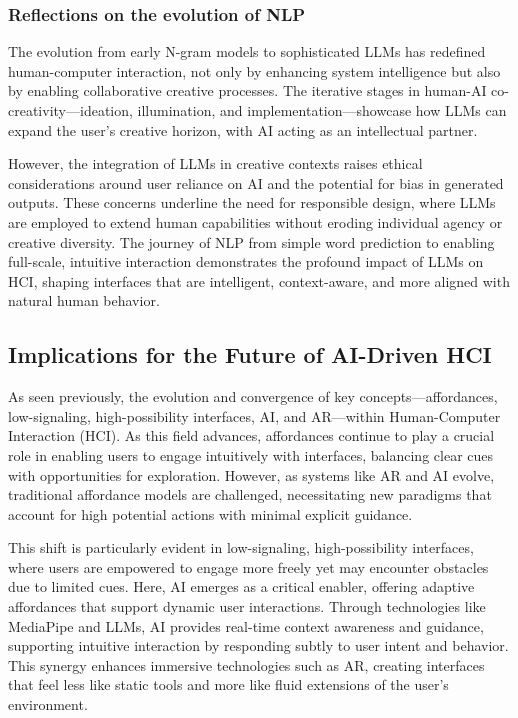 \subsubsection{Reflections on the evolution of NLP}

The evolution from early N-gram models to sophisticated LLMs has redefined human-computer interaction, not only by enhancing system intelligence but also by enabling collaborative creative processes.
The iterative stages in human-AI co-creativity—ideation, illumination, and implementation—showcase how LLMs can expand the user’s creative horizon, with AI acting as an intellectual partner\cite{Wan2023ItFL}.

However, the integration of LLMs in creative contexts raises ethical considerations around user reliance on AI and the potential for bias in generated outputs.
These concerns underline the need for responsible design, where LLMs are employed to extend human capabilities without eroding individual agency or creative diversity\cite{Yang2024HumanAIII}.
The journey of NLP from simple word prediction to enabling full-scale, intuitive interaction demonstrates the profound impact of LLMs on HCI, shaping interfaces that are intelligent, context-aware, and more aligned with natural human behavior.

\subsection{Implications for the Future of AI-Driven HCI}

As seen previously, the evolution and convergence of key concepts—affordances, low-signaling, high-possibility interfaces, AI, and AR—within Human-Computer Interaction (HCI).
As this field advances, affordances continue to play a crucial role in enabling users to engage intuitively with interfaces, balancing clear cues with opportunities for exploration.
However, as systems like AR and AI evolve, traditional affordance models are challenged, necessitating new paradigms that account for high potential actions with minimal explicit guidance.

This shift is particularly evident in low-signaling, high-possibility interfaces, where users are empowered to engage more freely yet may encounter obstacles due to limited cues.
Here, AI emerges as a critical enabler, offering adaptive affordances that support dynamic user interactions.
Through technologies like MediaPipe and LLMs, AI provides real-time context awareness and guidance, supporting intuitive interaction by responding subtly to user intent and behavior.
This synergy enhances immersive technologies such as AR, creating interfaces that feel less like static tools and more like fluid extensions of the user’s environment.

